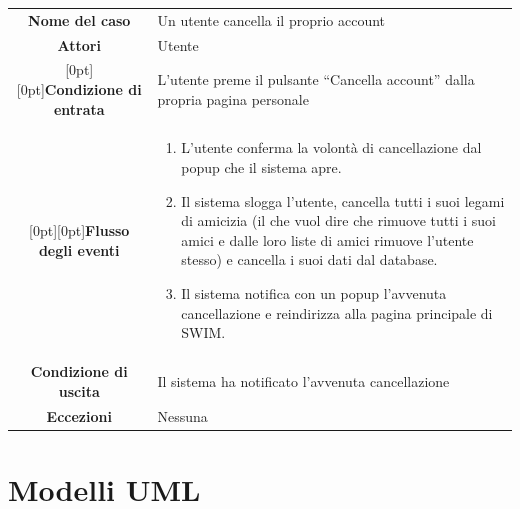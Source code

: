\documentclass[a4paper,12pt]{article}
\begin{document}
\begin{tabularx}{\textwidth}{|c|X|}
\rowcolor[gray]{.9}\hline  \textbf{Nome del caso} & Un utente cancella il proprio account \\
\rowcolor[gray]{.9}\hline  \textbf{Attori} & Utente \\ 
\rowcolor[gray]{.9}\hline  \raisebox{-1ex}[0pt][0pt]{\textbf{Condizione di entrata}} & L'utente preme il pulsante “Cancella account” dalla propria pagina personale \\
\rowcolor[gray]{.9}\hline  \raisebox{-12ex}[0pt][0pt]{\textbf{Flusso degli eventi}} & 
\begin{enumerate}
\itemsep0em
\item L'utente conferma la volontà di cancellazione dal popup che il sistema apre.
\item Il sistema slogga l'utente, cancella tutti i suoi legami di amicizia (il che vuol dire che rimuove tutti i suoi amici e dalle loro liste di amici rimuove l'utente stesso) e cancella i suoi dati dal database.
\item Il sistema notifica con un popup l'avvenuta cancellazione e reindirizza alla pagina principale di SWIM.
\end{enumerate}
 \\ 
\rowcolor[gray]{.9}\hline  \textbf{Condizione di uscita} & Il sistema ha notificato l'avvenuta cancellazione \\
\rowcolor[gray]{.9}\hline  \textbf{Eccezioni} & Nessuna
\\
\hline 
\end{tabularx}
\clearpage
\section{Modelli UML}
\end{document}
